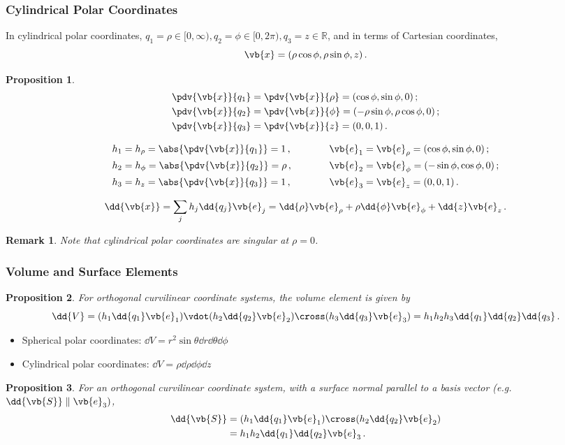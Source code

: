 \documentclass{article}
\theoremstyle{plain}\theoremheaderfont{\normalfont\itshape}\theorembodyfont{\rmfamily}\theoremseparator{.}\newtheorem*{rem}{Remark}\newtheorem*{ex}{Example}\newtheorem*{proof}{Proof}\newtheorem*{altp}{Alternative proof}
\theoremstyle{plain}\theoremheaderfont{\normalfont\bfseries}\theorembodyfont{\rmfamily}\theoremseparator{.}\newtheorem{thm}{Theorem}[section]\newtheorem{lem}[thm]{Lemma}\newtheorem{prop}[thm]{Proposition}\newtheorem*{cor}{Corollary}\newtheorem{defn}[thm]{Definition}\newtheorem{clm}[thm]{Claim}\newtheorem{clminproof}{Claim}
\theoremstyle{break}\theoremheaderfont{\normalfont\itshape}\theorembodyfont{\rmfamily}\theoremseparator{.\medskip}\newtheorem*{proofskip}{Proof}\newtheorem*{exs}{Examples}\newtheorem*{rems}{Remarks}
\theoremstyle{break}\theoremheaderfont{\normalfont\bfseries}\theorembodyfont{\rmfamily}\theoremseparator{.\medskip}\newtheorem{lemskip}[thm]{Lemma}\newtheorem{defnskip}[thm]{Definition}\newtheorem{propskip}[thm]{Proposition}\newtheorem{thmskip}[thm]{Theorem}
\numberwithin{equation}{section}
\begin{document}
	\subsubsection{Cylindrical Polar Coordinates}
	In cylindrical polar coordinates, \(q_1=\rho\in[0,\infty), q_2=\phi\in[0,2\pi), q_3=z\in\mathbb{R}\), and in terms of Cartesian coordinates,
	\[\vb{x}=(\rho\cos\phi,\rho\sin\phi,z)\,.\]
	\begin{prop}
		\begin{align*}
			&\pdv{\vb{x}}{q_1}=\pdv{\vb{x}}{\rho}=(\cos\phi,\sin\phi,0)\,;\\
			&\pdv{\vb{x}}{q_2}=\pdv{\vb{x}}{\phi}=(-\rho\sin\phi,\rho\cos\phi,0)\,;\\
			&\pdv{\vb{x}}{q_3}=\pdv{\vb{x}}{z}=(0,0,1)\,.
		\end{align*}
		
		\begin{align*}
			&h_1=h_\rho=\abs{\pdv{\vb{x}}{q_1}}=1\,,\qquad\quad &\vb{e}_1&=\vb{e}_\rho=(\cos\phi,\sin\phi,0)\,;\\
			&h_2=h_\phi=\abs{\pdv{\vb{x}}{q_2}}=\rho\,, &\vb{e}_2&=\vb{e}_\phi=(-\sin\phi,\cos\phi,0)\,;\\
			&h_3=h_z=\abs{\pdv{\vb{x}}{q_3}}=1\,, &\vb{e}_3&=\vb{e}_z=(0,0,1)\,.
		\end{align*}
		
		\[\dd{\vb{x}}=\sum_j h_j\dd{q_j}\vb{e}_j=\dd{\rho}\vb{e}_\rho+\rho\dd{\phi}\vb{e}_\phi+\dd{z}\vb{e}_z\,.\]
	\end{prop}
	\begin{rem}
		Note that cylindrical polar coordinates are singular at \(\rho=0\).
	\end{rem}
	
	\subsubsection{Volume and Surface Elements}
	\begin{prop}
		For orthogonal curvilinear coordinate systems, the volume element is given by
		\[\dd{V}=(h_1\dd{q_1}\vb{e}_1)\vdot(h_2\dd{q_2}\vb{e}_2)\cross(h_3\dd{q_3}\vb{e}_3)=h_1h_2h_3\dd{q_1}\dd{q_2}\dd{q_3}\,.\]
	\end{prop}
	\begin{itemize}
		\item Spherical polar coordinates: \(\dd{V}=r^2\sin\theta\dd{r}\dd{\theta}\dd{\phi}\)
		\item Cylindrical polar coordinates: \(\dd{V}=\rho\dd{\rho}\dd{\phi}\dd{z}\)
	\end{itemize}
	\begin{prop}
		For an orthogonal curvilinear coordinate system, with a surface normal parallel to a basis vector (e.g. \(\dd{\vb{S}}\parallel\vb{e}_3)\),
		\begin{align*}
			\dd{\vb{S}}&=(h_1\dd{q_1}\vb{e}_1)\cross(h_2\dd{q_2}\vb{e}_2)\\
			&=h_1h_2\dd{q_1}\dd{q_2}\vb{e}_3\,.
		\end{align*}
	\end{prop}
	
\end{document}
